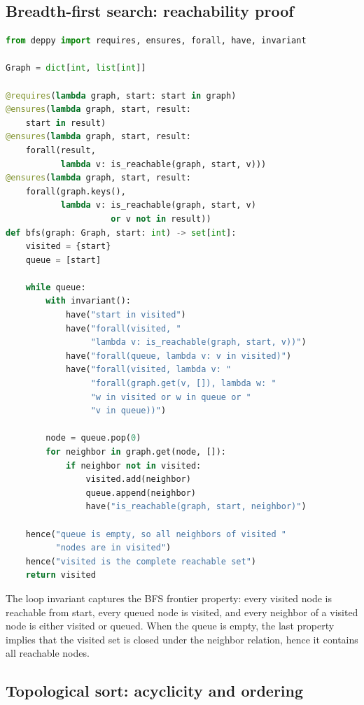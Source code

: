 \documentclass[11pt]{report}
\theoremstyle{definition}
\theoremstyle{plain}
\begin{document}
\subsection{Breadth-first search: reachability proof}

\begin{lstlisting}[style=deppy,language=Python]
from deppy import requires, ensures, forall, have, invariant

Graph = dict[int, list[int]]

@requires(lambda graph, start: start in graph)
@ensures(lambda graph, start, result:
    start in result)
@ensures(lambda graph, start, result:
    forall(result,
           lambda v: is_reachable(graph, start, v)))
@ensures(lambda graph, start, result:
    forall(graph.keys(),
           lambda v: is_reachable(graph, start, v)
                     or v not in result))
def bfs(graph: Graph, start: int) -> set[int]:
    visited = {start}
    queue = [start]

    while queue:
        with invariant():
            have("start in visited")
            have("forall(visited, "
                 "lambda v: is_reachable(graph, start, v))")
            have("forall(queue, lambda v: v in visited)")
            have("forall(visited, lambda v: "
                 "forall(graph.get(v, []), lambda w: "
                 "w in visited or w in queue or "
                 "v in queue))")

        node = queue.pop(0)
        for neighbor in graph.get(node, []):
            if neighbor not in visited:
                visited.add(neighbor)
                queue.append(neighbor)
                have("is_reachable(graph, start, neighbor)")

    hence("queue is empty, so all neighbors of visited "
          "nodes are in visited")
    hence("visited is the complete reachable set")
    return visited
\end{lstlisting}

The loop invariant captures the BFS frontier property: every visited node is
reachable from start, every queued node is visited, and every neighbor of a
visited node is either visited or queued. When the queue is empty, the last
property implies that the visited set is closed under the neighbor relation,
hence it contains all reachable nodes.

\subsection{Topological sort: acyclicity and ordering}
\end{document}
